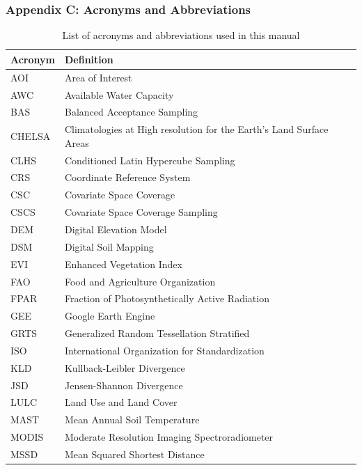\documentclass[
  10pt,
  b5paper,
  oneside]{book}
\begin{document}
\subsubsection*{Appendix C: Acronyms and Abbreviations}\label{appendix-c-acronyms-and-abbreviations}

\begin{table}

\caption{\label{tab:acronyms}List of acronyms and abbreviations used in this manual}
\centering
\begin{tabular}[t]{l|l}
\hline
Acronym & Definition\\
\hline
AOI & Area of Interest\\
\hline
AWC & Available Water Capacity\\
\hline
BAS & Balanced Acceptance Sampling\\
\hline
CHELSA & Climatologies at High resolution for the Earth's Land Surface Areas\\
\hline
CLHS & Conditioned Latin Hypercube Sampling\\
\hline
CRS & Coordinate Reference System\\
\hline
CSC & Covariate Space Coverage\\
\hline
CSCS & Covariate Space Coverage Sampling\\
\hline
DEM & Digital Elevation Model\\
\hline
DSM & Digital Soil Mapping\\
\hline
EVI & Enhanced Vegetation Index\\
\hline
FAO & Food and Agriculture Organization\\
\hline
FPAR & Fraction of Photosynthetically Active Radiation\\
\hline
GEE & Google Earth Engine\\
\hline
GRTS & Generalized Random Tessellation Stratified\\
\hline
ISO & International Organization for Standardization\\
\hline
KLD & Kullback-Leibler Divergence\\
\hline
JSD & Jensen-Shannon Divergence\\
\hline
LULC & Land Use and Land Cover\\
\hline
MAST & Mean Annual Soil Temperature\\
\hline
MODIS & Moderate Resolution Imaging Spectroradiometer\\
\hline
MSSD & Mean Squared Shortest Distance\\

\end{tabular}
\end{table}
\end{document}
